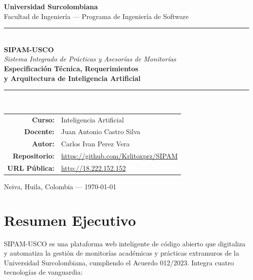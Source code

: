 \documentclass[12pt,a4paper,twoside]{report}
\begin{document}

\begin{titlepage}
\centering\vspace*{0.8cm}
{\LARGE\bfseries\textcolor{uscoRed}{Universidad Surcolombiana}}\\[0.3cm]
{\large Facultad de Ingeniería — Programa de Ingeniería de Software}\\[1.8cm]
\textcolor{uscoRed}{\rule{\textwidth}{2.5pt}}\\[0.7cm]
{\fontsize{28}{32}\selectfont\bfseries SIPAM-USCO}\\[0.4cm]
{\Large\itshape Sistema Integrado de Prácticas y Asesorías de Monitorías}\\[0.5cm]
{\LARGE\bfseries Especificación Técnica, Requerimientos\\y Arquitectura de Inteligencia Artificial}\\[0.7cm]
\textcolor{uscoRed}{\rule{\textwidth}{2.5pt}}\\[2cm]
\begin{tabular}{rl}
  \textbf{Curso:}       & Inteligencia Artificial \\[0.4cm]
  \textbf{Docente:}     & Juan Antonio Castro Silva \\[0.4cm]
  \textbf{Autor:}       & Carlos Ivan Perez Vera \\[0.4cm]
  \textbf{Repositorio:} & \url{https://github.com/Krlitoxprz/SIPAM} \\[0.4cm]
  \textbf{URL Pública:} & \url{http://18.222.152.152} \\
\end{tabular}
\vfill
{\large Neiva, Huila, Colombia \quad — \quad \today}
\end{titlepage}

\chapter*{Resumen Ejecutivo}

SIPAM-USCO es una plataforma web inteligente de código abierto que digitaliza y automatiza la gestión
de monitorías académicas y prácticas extramuros de la Universidad Surcolombiana, cumpliendo el
Acuerdo 012/2023. Integra cuatro tecnologías de vanguardia:
\end{document}
